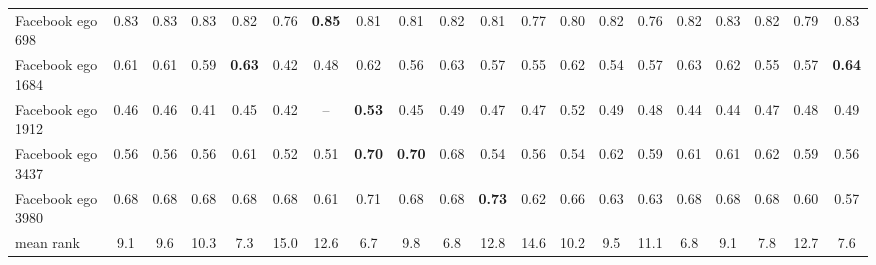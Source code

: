 \begin{table}[p]
\begin{ruledtabular}
\begin{tabular}{lccccccccccccccccccc}
Facebook ego 698 & 0.83 & 0.83 & 0.83 & 0.82 & 0.76 & \textbf{0.85} & 0.81 & 0.81 & 0.82 & 0.81 & 0.77 & 0.80 & 0.82 & 0.76 & 0.82 & 0.83 & 0.82 & 0.79 & 0.83 \\
Facebook ego 1684 & 0.61 & 0.61 & 0.59 & \textbf{0.63} & 0.42 & 0.48 & 0.62 & 0.56 & 0.63 & 0.57 & 0.55 & 0.62 & 0.54 & 0.57 & 0.63 & 0.62 & 0.55 & 0.57 & \textbf{0.64} \\
Facebook ego 1912 & 0.46 & 0.46 & 0.41 & 0.45 & 0.42 & -- & \textbf{0.53} & 0.45 & 0.49 & 0.47 & 0.47 & 0.52 & 0.49 & 0.48 & 0.44 & 0.44 & 0.47 & 0.48 & 0.49 \\
Facebook ego 3437 & 0.56 & 0.56 & 0.56 & 0.61 & 0.52 & 0.51 & \textbf{0.70} & \textbf{0.70} & 0.68 & 0.54 & 0.56 & 0.54 & 0.62 & 0.59 & 0.61 & 0.61 & 0.62 & 0.59 & 0.56 \\
Facebook ego 3980 & 0.68 & 0.68 & 0.68 & 0.68 & 0.68 & 0.61 & 0.71 & 0.68 & 0.68 & \textbf{0.73} & 0.62 & 0.66 & 0.63 & 0.63 & 0.68 & 0.68 & 0.68 & 0.60 & 0.57 \\
\hline
mean rank & 9.1 & 9.6 & 10.3 & 7.3 & 15.0 & 12.6 & 6.7 & 9.8 & 6.8 & 12.8 & 14.6 & 10.2 & 9.5 & 11.1 & 6.8 & 9.1 & 7.8 & 12.7 & 7.6 \\
\end{tabular}
\end{ruledtabular}
\end{table}

